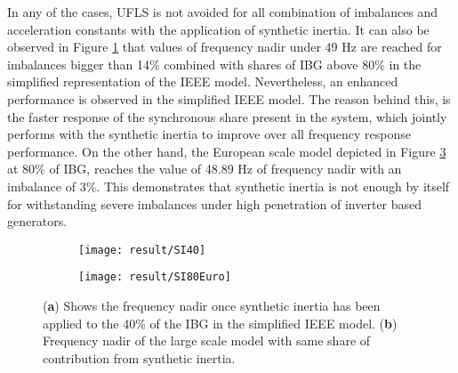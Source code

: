 In any of the cases, UFLS is not avoided for all combination of imbalances and acceleration constants with the application of synthetic inertia. It can also be observed in Figure \ref{fig:res_nadirieee_si} that values of frequency nadir under 49 Hz are reached for imbalances bigger than 14\% combined with shares of IBG above 80\% in the simplified representation of the IEEE model. Nevertheless, an enhanced performance is observed in the simplified IEEE model. The reason behind this, is the faster response of the synchronous share present in the system, which jointly performs with the synthetic inertia to improve over all frequency response performance. On the other hand, the European scale model depicted in Figure \ref{fig:res_nadireuro_si} at 80\% of IBG, reaches the value of 48.89 Hz of frequency nadir with an imbalance of 3\%. This demonstrates that synthetic inertia is not enough by itself for withstanding severe imbalances under high penetration of inverter based generators.  \\
\begin{figure}[h]
	\centering
	\begin{subfigure}[h]{0.49\textwidth}
		\centering
		\texttt{[image: result/SI40]}
		\caption{}
		\label{fig:res_nadirieee_si}
	\end{subfigure}
	\hfill
	\begin{subfigure}[h]{0.49\textwidth}
		\centering
		\texttt{[image: result/SI80Euro]}
		\caption{}
		\label{fig:res_nadireuro_si}
	\end{subfigure}
	
	
	\caption{(\textbf{a}) Shows the frequency nadir once synthetic inertia has been applied to the 40\% of the IBG in the simplified IEEE model. (\textbf{b}) Frequency nadir of the large scale model with same share of contribution from synthetic inertia.}
\end{figure}





